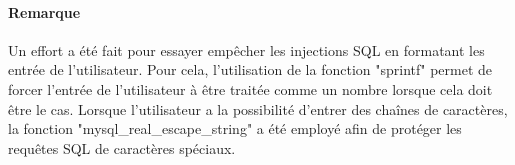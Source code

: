 \documentclass[12pt]{article}
\begin{document}
\paragraph{Remarque}
Un effort a été fait pour essayer empêcher les injections SQL en formatant
les entrée de l'utilisateur. Pour cela, l'utilisation de la fonction "sprintf"
permet de forcer l'entrée de l'utilisateur à être traitée comme un nombre
lorsque cela doit être le cas. Lorsque l'utilisateur a la possibilité
d'entrer des chaînes de caractères, la fonction "mysql\_real\_escape\_string"
a été employé afin de protéger les requêtes SQL de caractères spéciaux.
\end{document}

